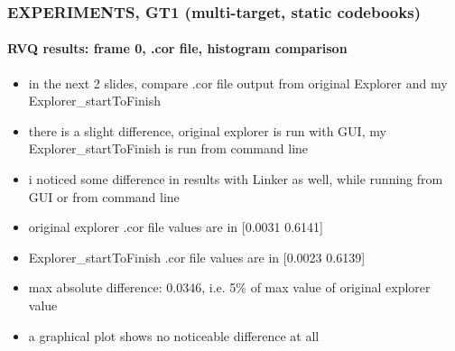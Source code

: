 


\begin{frame}
\frametitle{\small EXPERIMENTS, GT1 (multi-target, static codebooks)}
\framesubtitle{RVQ results: frame 0, .cor file, histogram comparison}
\mypagenum
	\begin{itemize}
		\item in the next 2 slides, compare .cor file output from original Explorer and my Explorer\_startToFinish
		\item there is a slight difference, original explorer is run with GUI, my Explorer\_startToFinish is run from command line
		\item i noticed some difference in results with Linker as well, while running from GUI or from command line
		\item original explorer .cor file values are in [0.0031 0.6141]
		\item Explorer\_startToFinish .cor file values are in [0.0023 0.6139]
		\item max absolute difference: 0.0346, i.e. 5\% of max value of original explorer value
		\item a graphical plot shows no noticeable difference at all
 	\end{itemize}
\end{frame}



